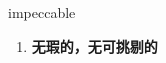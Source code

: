 
\begin{frame}
{\huge impeccable}
\begin{center}
\begin{enumerate}\Large
  \item \textbf{无瑕的，无可挑剔的}
\end{enumerate}
\end{center}
\end{frame}
